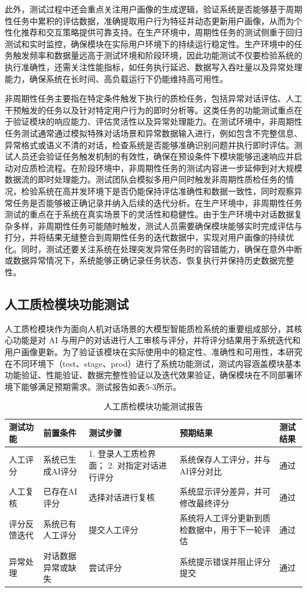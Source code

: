 此外，测试过程中还会重点关注用户画像的生成逻辑，验证系统是否能够基于周期性任务中累积的评估数据，准确提取用户行为特征并动态更新用户画像，从而为个性化推荐和交互策略提供可靠支持。在生产环境中，周期性任务的测试侧重于回归测试和实时监控，确保模块在实际用户环境下的持续运行稳定性。生产环境中的任务触发频率和数据量远高于测试环境和阶段环境，因此功能测试不仅要检验系统的执行准确性，还需关注性能指标，如任务执行延迟、数据写入吞吐量以及异常处理能力，确保系统在长时间、高负载运行下仍能维持高可用性。

非周期性任务主要指在特定条件触发下执行的质检任务，包括异常对话评估、人工干预触发的任务以及针对特定用户行为的即时分析等。这类任务的功能测试重点在于验证模块的响应能力、评估灵活性以及异常处理能力。在测试环境中，非周期性任务测试通常通过模拟特殊对话场景和异常数据输入进行，例如包含不完整信息、异常格式或语义不清的对话，检查系统是否能够准确识别问题并执行即时评估。测试人员还会验证任务触发机制的有效性，确保在预设条件下模块能够迅速响应并启动对应质检流程。在阶段环境中，非周期性任务的测试内容进一步延伸到对大规模数据流的即时处理能力。测试团队会模拟多用户同时触发非周期性质检任务的情况，检验系统在高并发环境下是否仍能保持评估准确性和数据一致性，同时观察异常任务是否能够被正确记录并纳入后续的迭代分析。在生产环境中，非周期性任务测试的重点在于系统在真实场景下的灵活性和稳健性。由于生产环境中对话数据复杂多样，非周期性任务可能随时触发，测试人员需要确保模块能够实时完成评估与打分，并将结果无缝整合到周期性任务的迭代数据中，实现对用户画像的持续优化。同时，测试还要关注系统在处理突发异常任务时的容错能力，确保在意外中断或数据异常情况下，系统能够正确记录任务状态、恢复执行并保持历史数据完整性。
\subsection{人工质检模块功能测试}
人工质检模块作为面向人机对话场景的大模型智能质检系统的重要组成部分，其核心功能是对 AI 与用户的对话进行人工审核与评分，并将评分结果用于系统迭代和用户画像更新。为了验证该模块在实际使用中的稳定性、准确性和可用性，本研究在不同环境下（test、stage、prod）进行了系统功能测试，测试内容涵盖模块基本功能验证、性能验证、数据完整性验证以及迭代效果验证，确保模块在不同部署环境下能够满足预期需求。测试报告如表5-3所示。
\begin{table}[htb]
\centering
\caption{人工质检模块功能测试报告}
\label{tab:manual-task-test}
{\renewcommand{\arraystretch}{1.2}
\begin{tabular}{p{3cm} p{2cm} p{2cm} p{3cm} p{2cm}}
\hline
测试功能 & 前置条件 & 测试步骤 & 预期结果 & 测试结果 \\
\hline
人工评分 & 系统已生成AI评分 & 1. 登录人工质检界面； 2. 对指定对话进行评分 & 系统保存人工评分，并与AI评分对比 & 通过 \\ \hline
人工复核 & 已存在AI评分 & 选择对话进行复核 & 系统显示评分差异，并可修改最终评分 & 通过 \\ \hline
评分反馈迭代 & 系统已有人工评分 & 提交人工评分 & 系统将人工评分更新到质检数据中，用于下一轮评估 & 通过 \\ \hline
异常处理 & 对话数据异常或缺失 & 尝试评分 & 系统提示错误并阻止评分提交 & 通过\\
\hline
\end{tabular}}
\end{table}

